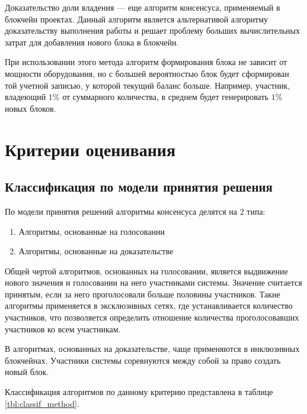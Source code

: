                 Доказательство доли владения\cite{king2012ppcoin} --- еще алгоритм консенсуса, применяемый в блокчейн проектах. Данный алгоритм является альтернативой алгоритму доказательству выполнения работы и решает проблему больших вычислительных затрат для добавления нового блока в блокчейн.
                
                При использовании этого метода алгоритм формирования блока не зависит от мощности оборудования, но с большей вероятностью блок будет сформирован той учетной записью, у которой текущий баланс больше. Например, участник, владеющий \( 1\%  \) от суммарного количества, в среднем будет генерировать \( 1\% \) новых блоков.
    
    \section{Критерии оценивания}
    
        \subsection{Классификация по модели принятия решения}
        
            По модели принятия решений алгоритмы консенсуса делятся на 2 типа:
            
            \begin{enumerate}
                \item Алгоритмы, основанные на голосовании
                \item Алгоритмы, основанные на доказательстве
            \end{enumerate}
            
            Общей чертой алгоритмов, основанных на голосовании, является выдвижение нового значения и голосовании на него участниками системы. Значение считается принятым, если за него проголосовали больше половины участников. Такие алгоритмы применяется в эксклюзивных сетях, где устанавливается количество участников, что позволяется определить отношение количества проголосовавших участников ко всем участникам.
            
            В алгоритмах, основанных на доказательстве, чаще применяются в инклюзивных блокчейнах. Участники системы соревнуются между собой за право создать новый блок.
            
            Классификация алгоритмов по данному критерию представлена в таблице \ref{tbl:classif_method}.
            
